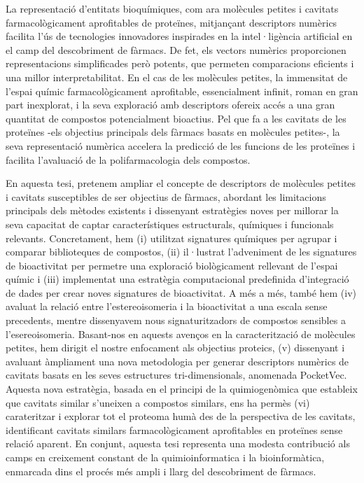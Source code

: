
La representació d'entitats bioquímiques, com ara molècules petites i cavitats farmacològicament aprofitables de proteïnes, mitjançant descriptors numèrics facilita l'ús de tecnologies innovadores inspirades en la intel·ligència artificial en el camp del descobriment de fàrmacs. De fet, els vectors numèrics proporcionen representacions simplificades però potents, que permeten comparacions eficients i una millor interpretabilitat. En el cas de les molècules petites, la immensitat de l'espai químic farmacològicament aprofitable, essencialment infinit, roman en gran part inexplorat, i la seva exploració amb descriptors ofereix accés a una gran quantitat de compostos potencialment bioactius. Pel que fa a les cavitats de les proteïnes -els objectius principals dels fàrmacs basats en molècules petites-, la seva representació numèrica accelera la predicció de les funcions de les proteïnes i facilita l'avaluació de la polifarmacologia dels compostos. 

En aquesta tesi, pretenem ampliar el concepte de descriptors de molècules petites i cavitats susceptibles de ser objectius de fàrmacs, abordant les limitacions principals dels mètodes existents i dissenyant estratègies noves per millorar la seva capacitat de captar característiques estructurals, químiques i funcionals relevants. Concretament, hem (i) utilitzat signatures químiques per agrupar i comparar biblioteques de compostos, (ii) il·lustrat l'adveniment de les signatures de bioactivitat per permetre una exploració biològicament rellevant de l'espai químic i (iii) implementat una estratègia computacional predefinida d'integració de dades per crear noves signatures de bioactivitat. A més a més, també hem (iv) avaluat la relació entre l'estereoisomeria i la bioactivitat a una escala sense precedents, mentre dissenyavem nous signaturitzadors de compostos sensibles a l'esereoisomeria. Basant-nos en aquests avenços en la caracterització de molècules petites, hem dirigit el nostre enfocament als objectius proteics, (v) dissenyant i avaluant àmpliament una nova metodologia per generar descriptors numèrics de cavitats basats en les seves estructures tri-dimensionals, anomenada PocketVec. Aquesta nova estratègia, basada en el principi de la quimiogenòmica que estableix que cavitats similar s'uneixen a compostos similars, ens ha permès (vi) carateritzar i explorar tot el proteoma humà des de la perspectiva de les cavitats, identificant cavitats similars farmacològicament aprofitables en proteïnes sense relació aparent. En conjunt, aquesta tesi representa una modesta contribució als camps en creixement constant de la quimioinformatica i la bioinformàtica, enmarcada dins el procés més ampli i llarg del descobriment de fàrmacs.
